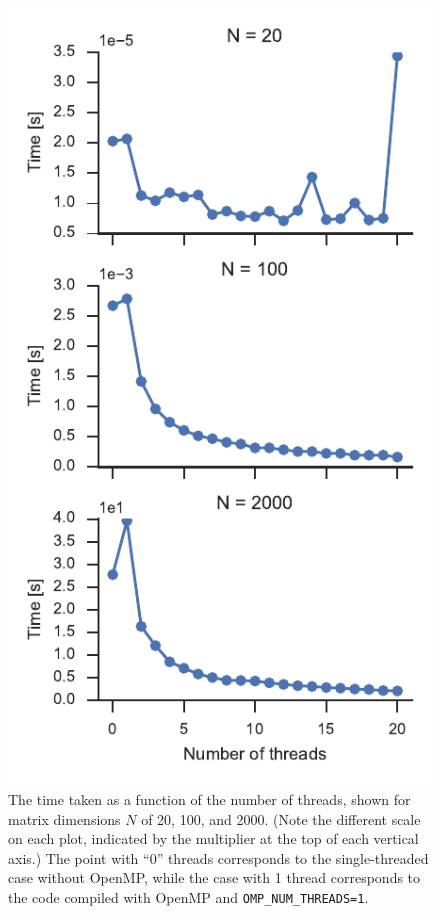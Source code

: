 \documentclass{article}
\begin{document}
\begin{figure}[p]
    \centering
    \includegraphics{th_v_time.pdf}
    \caption{The time taken as a function of the number of threads, shown for matrix dimensions $N$ of 20, 100, and 2000. (Note the different scale on each plot, indicated by the multiplier at the top of each vertical axis.) The point with ``0'' threads corresponds to the single-threaded case without OpenMP, while the case with 1 thread corresponds to the code compiled with OpenMP and \texttt{OMP\_NUM\_THREADS=1}.}
    \label{fig:thvtime}
\end{figure}
\end{document}
